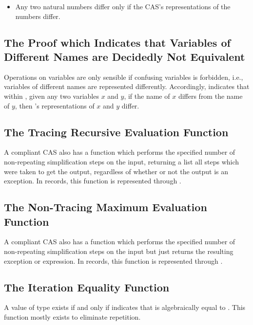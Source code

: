 \documentclass{report}
\begin{document}
\begin{itemize}
  \item Any two natural numbers differ only if the CAS's representations of the numbers differ.
\end{itemize}

\subsection{The Proof which Indicates that Variables of Different Names are Decidedly Not Equivalent}
Operations on variables are only sensible if confusing variables is forbidden, i.e., variables of different names are represented differently.  Accordingly,   indicates that within , given any two variables \(x\) and \(y\), if the name of \(x\) differs from the name of \(y\), then 's representations of \(x\) and \(y\) differ.

\subsection{The Tracing Recursive Evaluation Function}
A compliant CAS also has a function which performs the specified number of non-repeating simplification steps on the input, returning a list all steps which were taken to get the output, regardless of whether or not the output is an exception.  In  records, this function is represented through .

\subsection{The Non-Tracing Maximum Evaluation Function}
A compliant CAS also has a function which performs the specified number of non-repeating simplification steps on the input but just returns the resulting exception or expression.  In  records, this function is represented through .

\subsection{The Iteration Equality Function}
A value of type      exists if and only if      indicates that  is algebraically equal to .  This function mostly exists to eliminate repetition.
\end{document}
